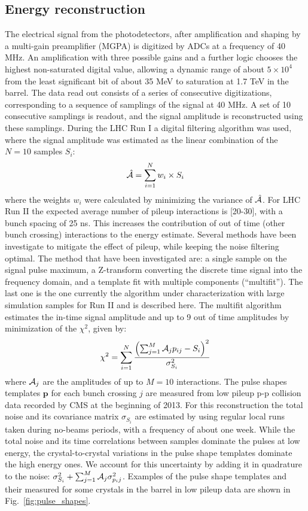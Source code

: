 \documentclass[journal]{IEEEtran}
\begin{document}
\subsection{Energy reconstruction}

The electrical signal from the photodetectors, after amplification and shaping by a multi-gain preamplifier (MGPA) is digitized by ADCs at a frequency of 40 MHz. An amplification with three possible gains and a further logic chooses the highest non-saturated digital value, allowing a dynamic range of about $5 \times 10^4$ from the least significant bit of about 35 MeV to saturation at 1.7 TeV in the barrel.
The data read out consists of a series of consecutive digitizations, corresponding to a sequence of samplings of the signal at 40 MHz. A set of 10 consecutive samplings is readout, and the signal amplitude is reconstructed using these samplings. During the LHC Run I a digital filtering algorithm was used, where the signal amplitude was estimated as the linear combination of the $N=10$ samples $S_i$:
\begin{equation}
\hat{\cal A}=\sum_{i=1}^{N} w_i \times S_i
\end{equation}
where the weights $w_i$ were calculated by minimizing the variance of $\hat{\cal A}$. 
For LHC Run II the expected average number of pileup interactions is [20-30], with a bunch spacing of 25 ns. This increases the contribution of out of time (other bunch crossing) interactions to the energy estimate. Several methods have been investigate to mitigate the effect of pileup, while keeping the noise filtering optimal. The method that have been investigated are: a single sample on the signal pulse maximum, a Z-transform converting the discrete time signal into the frequency domain, and a template fit with multiple components (``multifit''). The last one is the one currently the algorithm under characterization with large simulation samples for Run II and is described here.
The multifit algorithm estimates the in-time signal amplitude and up to 9 out of time amplitudes by minimization of the $\chi^2$, given by:
\begin{equation}
\chi^2 = \sum_{i=1}^{N} \frac{\left(\sum_{j=1}^M {\cal A}_{j}p_{ij} - S_i \right)^2}{\sigma^2_{S_i}}
\end{equation}
where ${\cal A}_{j}$ are the amplitudes of up to $M=10$ interactions. The pulse shapes templates $\mathbf p$ for each bunch crossing $j$ are measured from low pileup p-p collision data recorded by CMS at the beginning of 2013.
For this reconstruction the total noise and its covariance matrix $\sigma_{S_i}$ are estimated by using regular local runs taken during no-beams periods, with a frequency of about one week. While the total noise and its time correlations between samples dominate the pulses at low energy, the crystal-to-crystal variations in the pulse shape templates dominate the high energy ones. We account for this uncertainty by adding it in quadrature to the noise: $\sigma_{S_i}^2+\sum_{j=1}^M {\cal A}_{j}\sigma_{p_ij}^2$. Examples of the pulse shape templates and their measured for some crystals in the barrel in low pileup data are shown in Fig.~\ref{fig:pulse_shapes}. 
\end{document}
